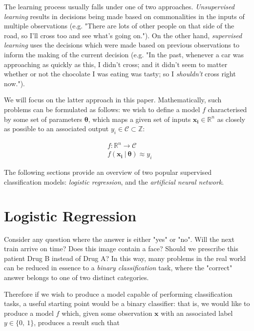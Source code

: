 \documentclass{article}[11pt]
\begin{document}
    The learning process usually falls under one of two approaches. \textit{Unsupervised learning} results in decisions being made based on commonalities in the inputs of multiple observations (e.g. "There are lots of other people on that side of the road, so I'll cross too and see what's going on."). On the other hand, \textit{supervised learning} uses the decisions which were made based on previous observations to inform the making of the current decision (e.g. "In the past, whenever a car was approaching as quickly as this, I didn't cross; and it didn't seem to matter whether or not the chocolate I was eating was tasty; so I \textit{shouldn't} cross right now.").
    
    We will focus on the latter approach in this paper. Mathematically, such problems can be formulated as follows: we wish to define a model $f$ characterised by some set of parameters $\boldsymbol{\theta}$, which maps a given set of inputs $\mathbf{x_i} \in \mathbb{R}^n$ as closely as possible to an associated output $y_i \in \mathcal{C} \subset \mathbb{Z}$:
    
    $$ \begin{aligned}
    &f \colon \mathbb{R}^n \to \mathcal{C} \\
    &f(\mathbf{x_i} \ \vert \ \boldsymbol{\theta}) \approx y_i
    \end{aligned} $$
    
    The following sections provide an overview of two popular supervised classification models: \textit{logistic regression}, and the \textit{artificial neural network}.
    


\section{Logistic Regression} \label{sec:logreg}

    Consider any question where the answer is either "yes" or "no". Will the next train arrive on time? Does this image contain a face? Should we prescribe this patient Drug B instead of Drug A? In this way, many problems in the real world can be reduced in essence to a \textit{binary classification} task, where the "correct" answer belongs to one of two distinct categories.

    Therefore if we wish to produce a model capable of performing classification tasks, a useful starting point would be a binary classifier: that is, we would like to produce a model $f$ which, given some observation $\mathbf{x}$ with an associated label $y \in \{0, \ 1\}$, produces a result such that
    
\end{document}
